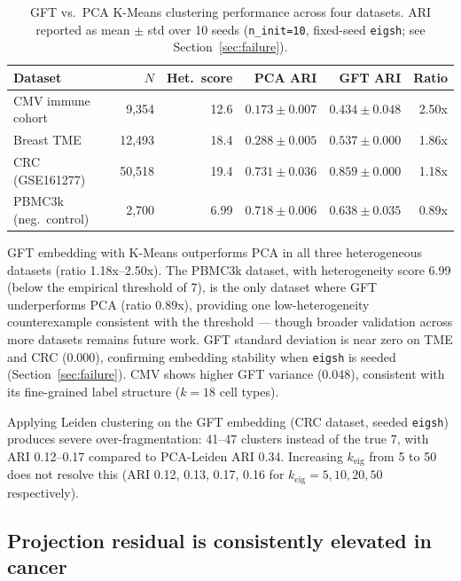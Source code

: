 \documentclass{article}
\begin{document}
\begin{table}[h]
\caption{GFT vs.\ PCA K-Means clustering performance across four datasets. ARI reported as mean $\pm$ std over 10 seeds (\texttt{n\_init=10}, fixed-seed \texttt{eigsh}; see Section~\ref{sec:failure}).}
\label{tab:gft}
\centering
\begin{tabular}{lrrrrr}
\toprule
Dataset & $N$ & Het.\ score & PCA ARI & GFT ARI & Ratio \\
\midrule
CMV immune cohort      & 9{,}354  & 12.6 & $0.173\pm0.007$ & $0.434\pm0.048$ & 2.50x \\
Breast TME             & 12{,}493 & 18.4 & $0.288\pm0.005$ & $0.537\pm0.000$ & 1.86x \\
CRC (GSE161277)        & 50{,}518 & 19.4 & $0.731\pm0.036$ & $0.859\pm0.000$ & 1.18x \\
PBMC3k (neg.\ control) &  2{,}700 &  6.99 & $0.718\pm0.006$ & $0.638\pm0.035$ & 0.89x \\
\bottomrule
\end{tabular}
\end{table}

GFT embedding with K-Means outperforms PCA in all three heterogeneous datasets (ratio 1.18x--2.50x). The PBMC3k dataset, with heterogeneity score 6.99 (below the empirical threshold of 7), is the only dataset where GFT underperforms PCA (ratio 0.89x), providing one low-heterogeneity counterexample consistent with the threshold --- though broader validation across more datasets remains future work. GFT standard deviation is near zero on TME and CRC (0.000), confirming embedding stability when \texttt{eigsh} is seeded (Section~\ref{sec:failure}). CMV shows higher GFT variance (0.048), consistent with its fine-grained label structure ($k=18$ cell types).

Applying Leiden clustering on the GFT embedding (CRC dataset, seeded \texttt{eigsh}) produces severe over-fragmentation: 41--47 clusters instead of the true 7, with ARI 0.12--0.17 compared to PCA-Leiden ARI 0.34. Increasing $k_\text{eig}$ from 5 to 50 does not resolve this (ARI 0.12, 0.13, 0.17, 0.16 for $k_\text{eig}=5,10,20,50$ respectively).

\subsection{Projection residual is consistently elevated in cancer}
\end{document}

